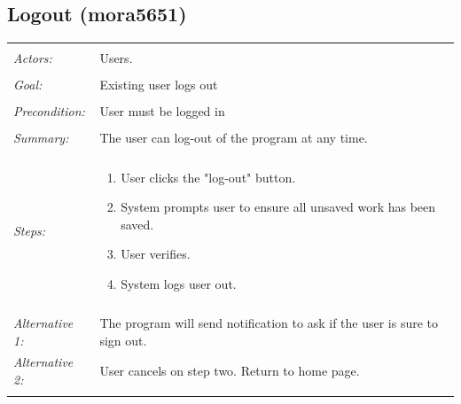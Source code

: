 \documentclass[11pt]{report}
\begin{document}
\subsection{Logout (mora5651)}
\begin{tabular}{ p{2cm} p{12cm} }
 \hline
 \\
 \textit{Actors:} & Users. \\ 
  \\
 \textit{Goal:} & Existing user logs out \\ 
 \\
 \textit{Precondition:} & User must be logged in \\
 \\
 \textit{Summary:}  & The user can log-out of the program at any time. \\
 \\
 \textit{Steps:} & \begin{enumerate}
 \item User clicks the "log-out" button. 
 \item System prompts user to ensure all unsaved work has been saved. 
 \item User verifies. 
 \item System logs user out. 
 \end{enumerate} \\
\\
  \textit{Alternative 1:} & The program will send notification to ask if the user is sure to sign out. \\
  \textit{Alternative 2:} & User cancels on step two. Return to home page. \\ 
 \\
\hline
\end{tabular}
\end{document}
